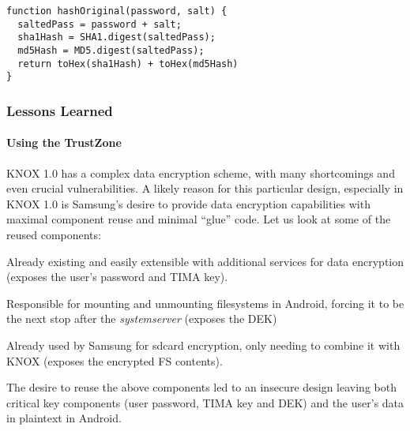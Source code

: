 \documentclass[11pt]{article}
\begin{document}
\begin{lstlisting}[caption={Previous Hash Algorithm}, label={lst:OriginalHashAlgo}]
function hashOriginal(password, salt) {
  saltedPass = password + salt;
  sha1Hash = SHA1.digest(saltedPass);
  md5Hash = MD5.digest(saltedPass);
  return toHex(sha1Hash) + toHex(md5Hash)
}
\end{lstlisting}

\subsubsection{Lessons Learned}
\paragraph{Using the TrustZone} \label{knox-1.0-data-encryption-lesson}
KNOX 1.0 has a complex data encryption scheme, with many shortcomings and even crucial vulnerabilities. 
A likely reason for this particular design, especially in KNOX 1.0 is Samsung's desire to provide data encryption capabilities with maximal component 
reuse and minimal ``glue'' code. Let us look at some of the reused components:
\begin{description}[labelindent=1cm] \setlength{\itemsep}{0pt}
  \item [system\textunderscore server] Already existing and easily extensible with additional services for data encryption (exposes the user's password and TIMA key).
  \item [vold] Responsible for mounting and unmounting filesystems in Android, forcing it to be the next stop after the \emph{system\textunderscore server} (exposes the DEK)
  \item [eCryptFS] Already used by Samsung for sdcard encryption, only needing to combine it with KNOX (exposes the encrypted FS contents).
\end{description}
The desire to reuse the above components led to an insecure design leaving both critical key components (user password, TIMA key and DEK) 
and the user's data in plaintext in Android. 
 
\end{document}
